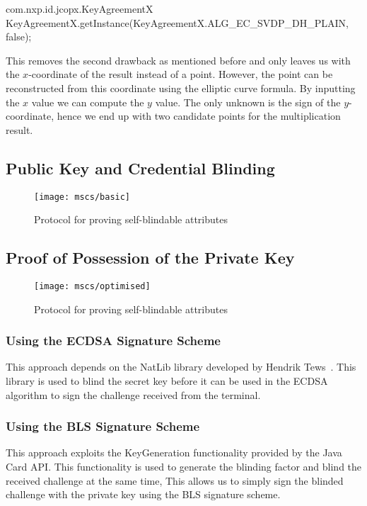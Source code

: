 com.nxp.id.jcopx.KeyAgreementX
KeyAgreementX.getInstance(KeyAgreementX.ALG\_EC\_SVDP\_DH\_PLAIN, false);

This removes the second drawback as mentioned before and only leaves us with the
$x$-coordinate of the result instead of a point. However, the point can be reconstructed
from this coordinate using the elliptic curve formula. By inputting the $x$ value
we can compute the $y$ value. The only unknown is the sign of the $y$-coordinate,
hence we end up with two candidate points for the multiplication result.

\subsection{Public Key and Credential Blinding}

\begin{figure}
  \centering
  \texttt{[image: mscs/basic]}
  \caption{Protocol for proving self-blindable attributes}\label{fig:basic}
\end{figure}

\subsection{Proof of Possession of the Private Key}

\begin{figure}
  \centering
  \texttt{[image: mscs/optimised]}
  \caption{Protocol for proving self-blindable attributes}\label{fig:optimised}
\end{figure}

\subsubsection{Using the ECDSA Signature Scheme}

This approach depends on the NatLib library developed by Hendrik
Tews~\cite{TewsJacobs09}. This library is used to blind the secret key before
it can be used in the ECDSA algorithm to sign the challenge received from the
terminal.

\subsubsection{Using the BLS Signature Scheme}

This approach exploits the KeyGeneration functionality provided by the Java Card
API. This functionality is used to generate the blinding factor and blind the
received challenge at the same time, This allows us to simply sign the blinded
challenge with the private key using the BLS signature scheme.

